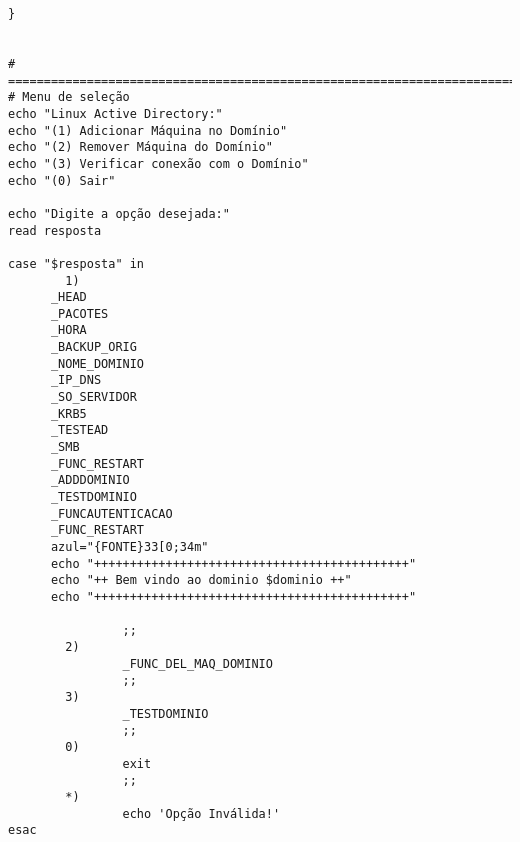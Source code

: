 \begin{lstlisting}
}
 
 
# =============================================================================
# Menu de seleção
echo "Linux Active Directory:"
echo "(1) Adicionar Máquina no Domínio"
echo "(2) Remover Máquina do Domínio"
echo "(3) Verificar conexão com o Domínio"
echo "(0) Sair"
 
echo "Digite a opção desejada:"
read resposta
 
case "$resposta" in
        1)  
      _HEAD
      _PACOTES
      _HORA
      _BACKUP_ORIG
      _NOME_DOMINIO
      _IP_DNS
      _SO_SERVIDOR
      _KRB5
      _TESTEAD
      _SMB
      _FUNC_RESTART
      _ADDDOMINIO
      _TESTDOMINIO
      _FUNCAUTENTICACAO
      _FUNC_RESTART
      azul="{FONTE}33[0;34m"
      echo "++++++++++++++++++++++++++++++++++++++++++++"
      echo "++ Bem vindo ao dominio $dominio ++"
      echo "++++++++++++++++++++++++++++++++++++++++++++"
  
                ;;  
        2)  
                _FUNC_DEL_MAQ_DOMINIO
                ;;  
        3)  
                _TESTDOMINIO
                ;;  
        0)  
                exit
                ;;  
        *)  
                echo 'Opção Inválida!'
esac

\end{lstlisting}
